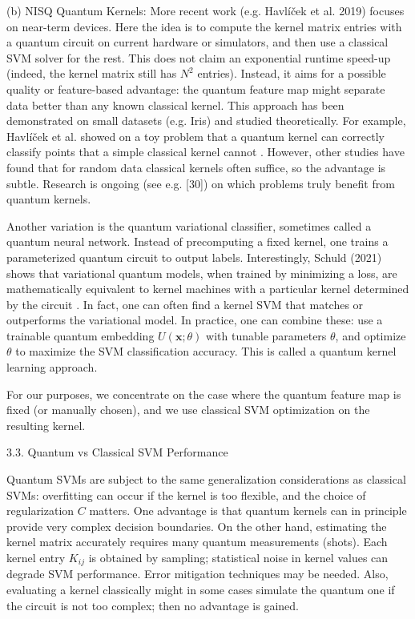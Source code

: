 (b) NISQ Quantum Kernels: More recent work (e.g. Havlíček et al. 2019) focuses on near-term devices.  Here the idea is to compute the kernel matrix entries with a quantum circuit on current hardware or simulators, and then use a classical SVM solver for the rest.  This does not claim an exponential runtime speed-up (indeed, the kernel matrix still has $N^2$ entries).  Instead, it aims for a possible quality or feature-based advantage: the quantum feature map might separate data better than any known classical kernel.  This approach has been demonstrated on small datasets (e.g. Iris) and studied theoretically.  For example, Havlíček et al. showed on a toy problem that a quantum kernel can correctly classify points that a simple classical kernel cannot .  However, other studies have found that for random data classical kernels often suffice, so the advantage is subtle.  Research is ongoing (see e.g. [30]) on which problems truly benefit from quantum kernels.



Another variation is the quantum variational classifier, sometimes called a quantum neural network.  Instead of precomputing a fixed kernel, one trains a parameterized quantum circuit to output labels.  Interestingly, Schuld (2021) shows that variational quantum models, when trained by minimizing a loss, are mathematically equivalent to kernel machines with a particular kernel determined by the circuit .  In fact, one can often find a kernel SVM that matches or outperforms the variational model.  In practice, one can combine these: use a trainable quantum embedding $U(\mathbf{x};\theta)$ with tunable parameters $\theta$, and optimize $\theta$ to maximize the SVM classification accuracy.  This is called a quantum kernel learning approach.



For our purposes, we concentrate on the case where the quantum feature map is fixed (or manually chosen), and we use classical SVM optimization on the resulting kernel.





3.3. Quantum vs Classical SVM Performance





Quantum SVMs are subject to the same generalization considerations as classical SVMs: overfitting can occur if the kernel is too flexible, and the choice of regularization $C$ matters.  One advantage is that quantum kernels can in principle provide very complex decision boundaries.  On the other hand, estimating the kernel matrix accurately requires many quantum measurements (shots).  Each kernel entry $K_{ij}$ is obtained by sampling; statistical noise in kernel values can degrade SVM performance.  Error mitigation techniques may be needed.  Also, evaluating a kernel classically might in some cases simulate the quantum one if the circuit is not too complex; then no advantage is gained.



